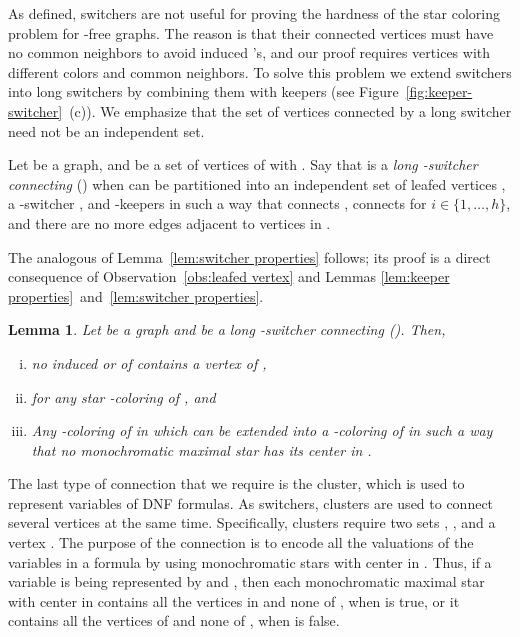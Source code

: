 \documentclass[a4paper, 11pt, oneside]{article}
\newtheorem{lemma}[theorem]{Lemma}
\newcommand{\range}[3]{\ensuremath{#1 \in \{#2,\ldots,#3\}}}
\let\Definition=\emph
\begin{document}
As defined, switchers are not useful for proving the hardness of the star coloring problem for -free graphs.  The reason is that their connected vertices must have no common neighbors to avoid induced 's, and our proof requires vertices with different colors and common neighbors.  To solve this problem we extend switchers into long switchers by combining them with keepers (see Figure~\ref{fig:keeper-switcher}~(c)).  We emphasize that the set of vertices connected by a long switcher need not be an independent set.

\begin{defn}\label{def:long switcher}
  Let  be a graph, and  be a set of vertices of  with .  Say that  is a \Definition{long -switcher connecting } () when  can be partitioned into an independent set of leafed vertices , a -switcher , and -keepers  in such a way that  connects ,  connects  for \range{i}{1}{h}, and there are no more edges adjacent to vertices in .
\end{defn}

The analogous of Lemma~\ref{lem:switcher properties} follows; its proof is a direct consequence of Observation~\ref{obs:leafed vertex} and Lemmas \ref{lem:keeper properties}~and~\ref{lem:switcher properties}.

\begin{lemma}\label{lem:long switcher properties}
 Let  be a graph and  be a long -switcher connecting  (). Then,
\begin{enumerate}[(i)]
  \item no induced  or  of  contains a vertex of ,
  \item  for any star -coloring  of , and \label{lem:long switcher properties:colors}
  \item Any -coloring  of  in which  can be extended into a -coloring of  in such a way that no monochromatic maximal star has its center in .\label{lem:long switcher properties:extension}
\end{enumerate}
\end{lemma}

The last type of connection that we require is the cluster, which is used to represent variables of DNF formulas.  As switchers, clusters are used to connect several vertices at the same time.  Specifically, clusters require two sets , , and a vertex .  The purpose of the connection is to encode all the valuations of the variables in a formula  by using monochromatic stars with center in .  Thus, if a variable  is being represented by  and , then each monochromatic maximal star with center in  contains all the vertices in  and none of , when  is true, or it contains all the vertices of  and none of , when  is false.
\end{document}
